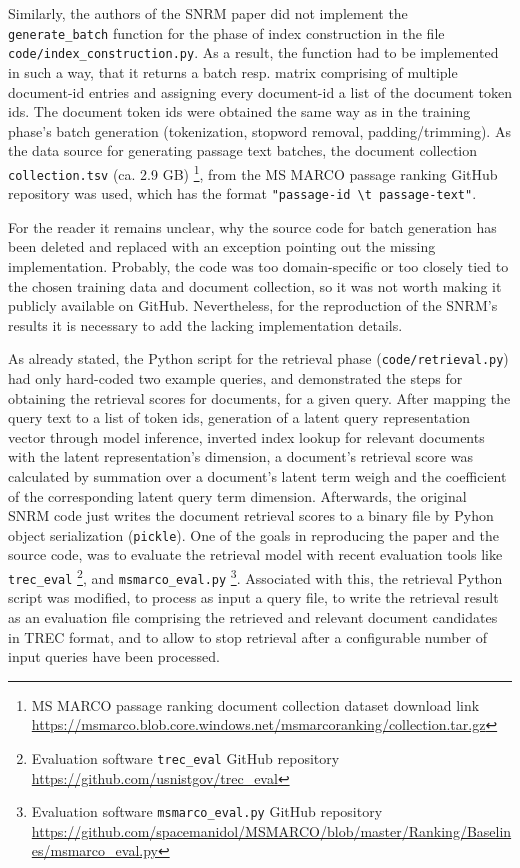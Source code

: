 
Similarly, the authors of the SNRM paper did not implement the \verb|generate_batch| function for the phase of index construction in 
    the file \verb|code/index_construction.py|. As a result, the function had to be implemented in such a way, that it returns a
    batch resp. matrix comprising of multiple document-id entries and assigning every document-id a list of the document token ids.
    The document token ids were obtained the same way as in the training phase's batch generation 
    (tokenization, stopword removal, padding/trimming).
As the data source for generating passage text batches, the document collection \verb|collection.tsv| (ca. 2.9 GB)
    \footnote{MS MARCO passage ranking document collection dataset download link 
    \url{https://msmarco.blob.core.windows.net/msmarcoranking/collection.tar.gz}}, 
    from the MS MARCO passage ranking GitHub repository was used, which has the format \verb|"passage-id \t passage-text"|.

For the reader it remains unclear, why the source code for batch generation has been deleted and replaced with an exception pointing out the
    missing implementation. 
Probably, the code was too domain-specific or too closely tied to the chosen training data and document collection,
    so it was not worth making it publicly available on GitHub.
Nevertheless, for the reproduction of the SNRM's results it is necessary to add the lacking implementation details.

As already stated, the Python script for the retrieval phase (\texttt{code/retrieval.py}) had only hard-coded two example queries,
    and demonstrated the steps for obtaining the retrieval scores for documents, for a given query.
After mapping the query text to a list of token ids, generation of a latent query representation vector through model inference, 
    inverted index lookup for relevant documents with the latent representation's dimension, a document's retrieval score was
    calculated by summation over a document's latent term weigh and the coefficient of the corresponding latent query term dimension.
Afterwards, the original SNRM code just writes the document retrieval scores to a binary file by Pyhon object serialization (\texttt{pickle}).
One of the goals in reproducing the paper and the source code, was to evaluate the retrieval model with recent evaluation tools like 
    \verb|trec_eval| \footnote{Evaluation software \texttt{trec\_eval} GitHub repository \url{https://github.com/usnistgov/trec_eval}},
    and \verb|msmarco_eval.py| 
    \footnote{Evaluation software \texttt{msmarco\_eval.py} GitHub repository \url{https://github.com/spacemanidol/MSMARCO/blob/master/Ranking/Baselines/msmarco_eval.py}}.
Associated with this, the retrieval Python script was modified, to process as input a query file, to write the retrieval result as an 
    evaluation file comprising the retrieved and relevant document candidates in TREC format, 
    and to allow to stop retrieval after a configurable number of input queries have been processed. 

